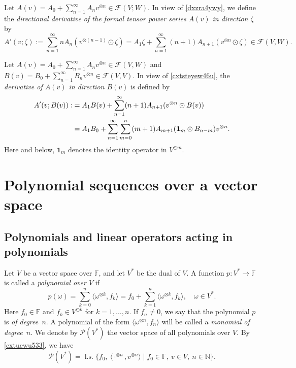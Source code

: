 \documentclass[12pt]{article}
\theoremstyle{remark}
\theoremstyle{remark}
\theoremstyle{remark}
\begin{document}
Let  $A(v)=A_0+\sum_{n=1}^\infty A_nv^{\otimes n}\in\mathcal F(V;W)$. In view of \eqref{dxzra4ywy}, we define the {\it directional  derivative of the formal tensor power series $A(v)$ in direction $\zeta$} by
\begin{equation}\label{cxtsteyew46u}
A'(v;\zeta):=\sum_{n=1}^\infty nA_n(v^{\otimes(n-1)}\odot \zeta)=A_1\zeta+\sum_{n=1}^\infty (n+1)A_{n+1}(v^{\otimes n}\odot\zeta)\in\mathcal F(V,W).
\end{equation}

Let $A(v)=A_0+\sum_{n=1}^\infty A_nv^{\otimes n}\in\mathcal F(V,W)$ and $B(v)=B_0+\sum_{n=1}^\infty B_nv^{\otimes n}\in\mathcal F(V,V)$. In view of \eqref{cxtsteyew46u}, the {\it derivative of $A(v)$ in direction $B(v)$} is defined by
\begin{align} A'(v;B(v)):&= A_1B(v)+\sum_{n=1}^\infty (n+1)A_{n+1}(v^{\otimes n}\odot B(v))\notag\\
&=A_1B_0+\sum_{n=1}^\infty \sum_{m=0}^n (m+1)A_{m+1}(\mathbf 1_m\odot B_{n-m})v^{\otimes n}.\notag
\end{align}
Here and below, $\mathbf 1_m$ denotes the identity operator in $V^{\odot m}$.

\section{Polynomial sequences over a vector space}\label{ctrdstrst6e}

\subsection{Polynomials and linear operators acting in polynomials}\label{dfgh5678h}

Let $V$ be a vector space over $\mathbb F$, and let $V^*$ be the dual of $V$. A function $p:V^*\to \mathbb{F}$ is called a {\it polynomial over $V$} if
\begin{equation}\label{cfgxtsu}
p(\omega)=\sum_{k=0}^n\langle \omega^{\otimes k},f_k\rangle=f_0+\sum_{k=1}^n\langle \omega^{\otimes k},f_k\rangle,\quad \omega \in V^*.\end{equation}   
Here $f_0\in \mathbb{F}$ and $f_k\in V^{\odot  k}$ for $k=1,\dots,n$. If $f_n\neq0$,   we say that the polynomial $p$ is {\it of degree~$n$}. 
A polynomial of the form $\langle \omega^{\otimes n},f_n\rangle$  will be called a {\it monomial of degree~$n$}.
We denote by $\mathcal P  (V^*)$  the vector space of all polynomials over $V$. 
 By \eqref{cxtuewu533}, we have
 \begin{equation}\label{fxzrsareysa}\mathcal P  (V^*)=\operatorname{l.s.}\big\{f_0,\ \langle \cdot^{\otimes n},v^{\otimes n}\rangle \mid f_0\in\mathbb F,\ v\in V,\ n\in \mathbb{N}\big\}.
\end{equation}
\end{document}
